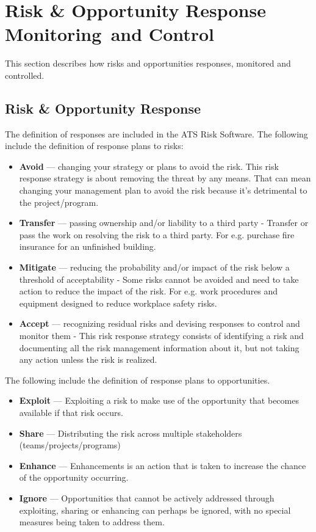 \section{Risk \& Opportunity Response\, Monitoring\, and Control}

This section describes how risks and opportunities responses, monitored and controlled.

\subsection {Risk \& Opportunity Response}

The definition of responses are included in the ATS Risk Software.
The following include the definition of response plans to risks:

\begin{itemize}
	\item \textbf{Avoid} ---
	changing your strategy or plans to avoid the risk. This risk response strategy is about removing the threat by any means. That can mean changing your management plan to avoid the risk because it’s detrimental to the project/program.

	\item \textbf{Transfer} ---
	passing ownership and/or liability to a third party - Transfer or pass the work on resolving the risk to a third party. For e.g. purchase fire insurance for an unfinished building.

	\item \textbf{Mitigate} ---
	reducing the probability and/or impact of the risk below a threshold of acceptability - Some risks cannot be avoided and need to take action to reduce the impact of the risk. For e.g. work procedures and equipment designed to reduce workplace safety risks.

	\item \textbf{Accept} ---
	recognizing residual risks and devising responses to control and monitor them - This risk response strategy consists of identifying a risk and documenting all the risk management information about it, but not taking any action unless the risk is realized. 
\end{itemize}

The following include the definition of response plans to opportunities.

\begin{itemize}
	\item \textbf{Exploit} ---
	Exploiting a risk to make use of the opportunity that becomes available if that risk occurs.

	\item \textbf{Share} ---
	Distributing the risk across multiple stakeholders (teams/projects/programs)

	\item \textbf{Enhance} ---
	Enhancements is an action that is taken to increase the chance of the opportunity occurring.

	\item \textbf{Ignore} ---
	Opportunities that cannot be actively addressed through exploiting, sharing or enhancing can perhaps be ignored, with no special measures being taken to address them.
\end{itemize}
